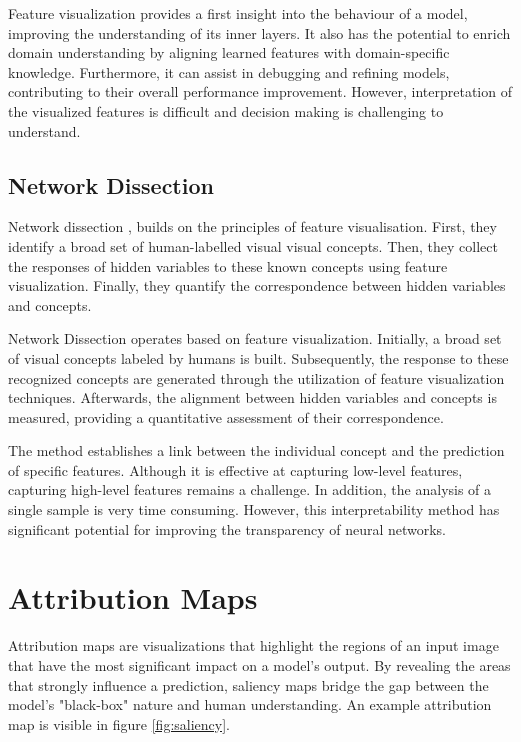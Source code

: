 Feature visualization provides a first insight into the behaviour of a model, improving the understanding of its inner layers. It also has the potential to enrich domain understanding by aligning learned features with domain-specific knowledge. Furthermore, it can assist in debugging and refining models, contributing to their overall performance improvement. However, interpretation of the visualized features is difficult and decision making is challenging to understand.

\subsection{Network Dissection}
\label{sec:network_dissection}

Network dissection \cite{Bau2017}, builds on the principles of feature visualisation. First, they identify a broad set of human-labelled visual visual concepts. Then, they collect the responses of hidden variables to these known concepts using feature visualization. Finally, they quantify the correspondence between hidden variables and concepts.

Network Dissection \cite{Bau2017} operates based on feature visualization. Initially, a broad set of visual concepts labeled by humans is built. Subsequently, the response to these recognized concepts are generated through the utilization of feature visualization techniques. Afterwards, the alignment between hidden variables and concepts is measured, providing a quantitative assessment of their correspondence.

The method establishes a link between the individual concept and the prediction of specific features. Although it is effective at capturing low-level features, capturing high-level features remains a challenge. In addition, the analysis of a single sample is very time consuming. However, this interpretability method has significant potential for improving the transparency of neural networks.

\section{Attribution Maps}
\label{sec:saliency}
Attribution maps are visualizations that highlight the regions of an input image that have the most significant impact on a model's output. By revealing the areas that strongly influence a prediction, saliency maps bridge the gap between the model's "black-box" nature and human understanding. An example attribution map is visible in figure \ref{fig:saliency}.

